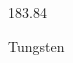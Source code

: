 \documentclass[12pt]{article}
\begin{document}
\hfill{}
\vfill
\begin{center}
  {\fontsize{50}{60}
  }

  \vspace{1em}

  183.84

Tungsten
\end{center}
\vfill
\end{document}
